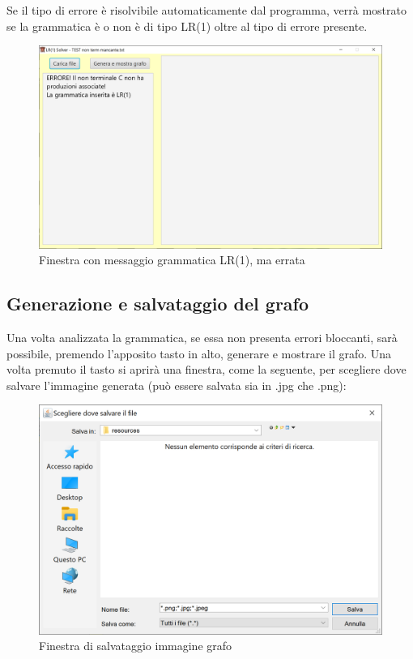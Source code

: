 \documentclass[12pt]{article}
\begin{document}
Se il tipo di errore è risolvibile automaticamente dal programma, verrà mostrato se la grammatica è o non è di tipo LR(1) oltre al tipo di errore presente.
\begin{figure}[h!]
\centering
\includegraphics[scale=0.5]{immagini/GrammaticaErrataRis.png}
\caption{Finestra con messaggio grammatica LR(1), ma errata}
\end{figure}
\pagebreak

\subsection{Generazione e salvataggio del grafo}
Una volta analizzata la grammatica, se essa non presenta errori bloccanti, sarà possibile, premendo l'apposito tasto in alto, generare e mostrare il grafo.
Una volta premuto il tasto si aprirà una finestra, come la seguente, per scegliere dove salvare l'immagine generata (può essere salvata sia in .jpg che .png):
\begin{figure}[h!]
\centering
\includegraphics[scale=0.6]{immagini/SalvaImmagine.png}
\caption{Finestra di salvataggio immagine grafo}
\end{figure}
\end{document}
